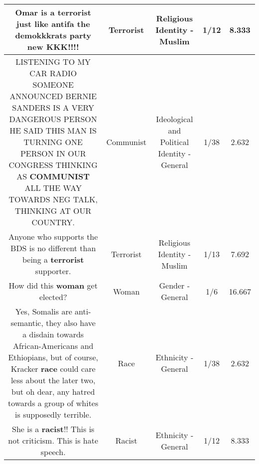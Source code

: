 \documentclass[11pt]{article}
\newlength\mylength
\begin{document}
\begin{center}
\begin{longtable}{|C{.65\mylength}|C{.30\mylength}|C{.12\mylength}|C{.12\mylength}|C{.12\mylength}|}
  \small Omar is a \textbf{terrorist} just like antifa the demokkkrats party new KKK!!!!\normalsize   & Terrorist & Religious Identity - Muslim & 1/12 & 8.333 \\  \hline
  \small LISTENING  TO MY CAR RADIO SOMEONE ANNOUNCED BERNIE SANDERS IS A VERY DANGEROUS PERSON HE SAID THIS MAN IS TURNING ONE PERSON IN OUR CONGRESS  THINKING AS \textbf{COMMUNIST}  ALL THE WAY TOWARDS NEG  TALK, THINKING  AT OUR COUNTRY.\normalsize   & Communist &  Ideological and Political Identity - General & 1/38 & 2.632 \\  \hline
  \small Anyone who supports the BDS is no different than being a \textbf{terrorist} supporter.\normalsize   & Terrorist & Religious Identity - Muslim & 1/13 & 7.692 \\  \hline
  \small How did this \textbf{woman} get elected?\normalsize   & Woman & Gender - General & 1/6 & 16.667 \\  \hline
  \small Yes, Somalis are anti-semantic, they also have a disdain towards African-Americans and Ethiopians, but of course, Kracker \textbf{race} could care less about the later two, but oh dear, any hatred towards a  group of whites is supposedly terrible.\normalsize   & Race & Ethnicity - General & 1/38 & 2.632 \\  \hline
  \small She is a \textbf{racist}!! This is not criticism. This is hate speech.\normalsize   & Racist & Ethnicity - General & 1/12 & 8.333 \\  \hline

\end{longtable}
\end{center}
\end{document}
